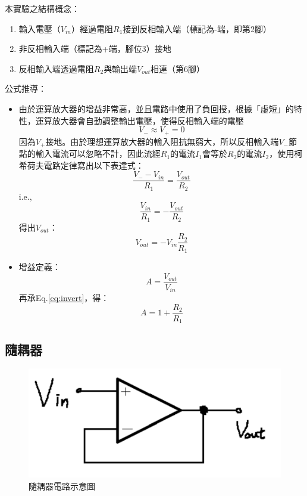 \documentclass[12pt,a4paper]{article}
\begin{document}
\begin{CJK}{UTF8}{bkai}
本實驗之結構概念：
\begin{enumerate}
    \item 輸入電壓（$V_{in}$）經過電阻$R_1$接到反相輸入端（標記為-端，即第2腳）
    \item 非反相輸入端（標記為+端，腳位3）接地
    \item 反相輸入端透過電阻$R_2$與輸出端$V_{out}$相連（第6腳）
\end{enumerate}
公式推導：
\begin{itemize}
    \item 由於運算放大器的增益非常高，並且電路中使用了負回授，根據「虛短」的特性，運算放大器會自動調整輸出電壓，使得反相輸入端的電壓
    \begin{equation}
        V_-\approx V_+ =0
    \end{equation}
    因為$V_+$接地。由於理想運算放大器的輸入阻抗無窮大，所以反相輸入端$V_-$節點的輸入電流可以忽略不計，因此流經$R_1$的電流$I_1$會等於$R_2$的電流$I_2$，使用柯希荷夫電路定律寫出以下表達式：
    \begin{equation}
        \frac{V_{-}-V_{in}}{R_1} = \frac{V_{out}}{R_{2}}
    \end{equation}
    i.e.,
    \begin{equation}
        \frac{V_{in}}{R_1} = -\frac{V_{out}}{R_2}
    \end{equation}
    得出$V_{out}$：
    \begin{equation}
    \label{eq:invert}
        V_{out} = -V_{in}\frac{R_2}{R_1}
    \end{equation}
    
    \item 增益定義：
    \begin{equation}
        A=\frac{V_{out}}{V_{in}}
    \end{equation}
    再承Eq.\ref{eq:invert}，得：
    \begin{equation}
        A=1+\frac{R_2}{R_1}
    \end{equation}
\end{itemize}

\subsection{隨耦器}
\hfill

\begin{figure}[h]
    \centering
    \includegraphics[width=0.5\linewidth]{figures/follower.png}
    \caption{隨耦器電路示意圖}
    \label{fig:follower}
\end{figure}


\end{CJK}
\end{document}
